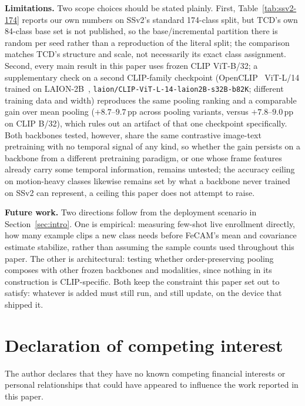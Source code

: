 \documentclass[a4paper,fleqn]{cas-dc}
\begin{document}
\textbf{Limitations.} Two scope choices should be stated plainly. First,
Table~\ref{tab:ssv2-174} reports our own numbers on SSv2's standard
174-class split, but TCD's own 84-class base set is not published, so the
base/incremental partition there is random per seed rather than a
reproduction of the literal split; the comparison matches TCD's structure
and scale, not necessarily its exact class assignment. Second, every main
result in this paper uses frozen CLIP ViT-B/32; a supplementary check on a
second CLIP-family checkpoint (OpenCLIP~\cite{ilharco2021openclip} ViT-L/14 trained on
LAION-2B~\cite{schuhmann2022laion5b}, \texttt{laion/CLIP-ViT-L-14-laion2B-s32B-b82K}; different
training data and width) reproduces the same pooling ranking and a comparable gain over
mean pooling ($+8.7$--$9.7$\,pp across pooling variants, versus
$+7.8$--$9.0$\,pp on CLIP B/32), which rules out an artifact of that one
checkpoint specifically. Both backbones tested, however, share the same
contrastive image-text pretraining with no temporal signal of any kind, so
whether the gain persists on a backbone from a different pretraining
paradigm, or one whose frame features already carry some temporal
information, remains untested; the accuracy ceiling on motion-heavy
classes likewise remains set by what a backbone never trained on SSv2 can
represent, a ceiling this paper does not attempt to raise.

\textbf{Future work.} Two directions follow from the deployment scenario
in Section~\ref{sec:intro}. One is empirical: measuring few-shot live
enrollment directly, how many example clips a new class needs before
FeCAM's mean and covariance estimate stabilize, rather than assuming the
sample counts used throughout this paper. The other is architectural:
testing whether order-preserving pooling composes with other frozen
backbones and modalities, since nothing in its construction is
CLIP-specific. Both keep the constraint this paper set out to satisfy:
whatever is added must still run, and still update, on the device that
shipped it.

\printcredits

\section*{Declaration of competing interest}
The author declares that they have no known competing financial interests
or personal relationships that could have appeared to influence the work
reported in this paper.
\end{document}
